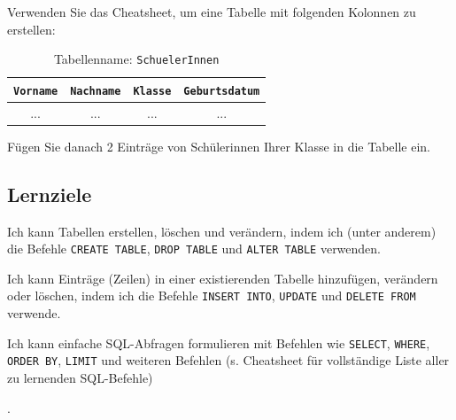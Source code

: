\begin{myexercise}
Verwenden Sie das Cheatsheet, um eine Tabelle mit folgenden Kolonnen zu erstellen:
\begin{table}[H]
\centering
\begin{tabular}{c|c|c|c}
\texttt{Vorname}&\texttt{Nachname}&\texttt{Klasse}&\texttt{Geburtsdatum}\\\midrule\midrule
...&...&...&...\\
\end{tabular}
\caption{Tabellenname: \texttt{SchuelerInnen}}
\end{table}
Fügen Sie danach 2 Einträge von Schülerinnen Ihrer Klasse in die Tabelle ein.
\end{myexercise}




\subsection*{Lernziele}
\begin{todolist}
\item Ich kann Tabellen erstellen, löschen und verändern, indem ich (unter anderem) die Befehle \lstinline|CREATE TABLE|, \lstinline|DROP TABLE| und \lstinline|ALTER TABLE| verwenden.
\item Ich kann Einträge (Zeilen) in einer existierenden Tabelle hinzufügen, verändern oder löschen, indem ich die Befehle \lstinline|INSERT INTO|, \lstinline|UPDATE| und \lstinline|DELETE FROM| verwende.
\item Ich kann einfache SQL-Abfragen formulieren mit Befehlen wie \lstinline|SELECT|, \lstinline|WHERE|,  \lstinline|ORDER BY|, \lstinline|LIMIT| und weiteren Befehlen (s. Cheatsheet für vollständige Liste aller zu lernenden SQL-Befehle)
\end{todolist}.